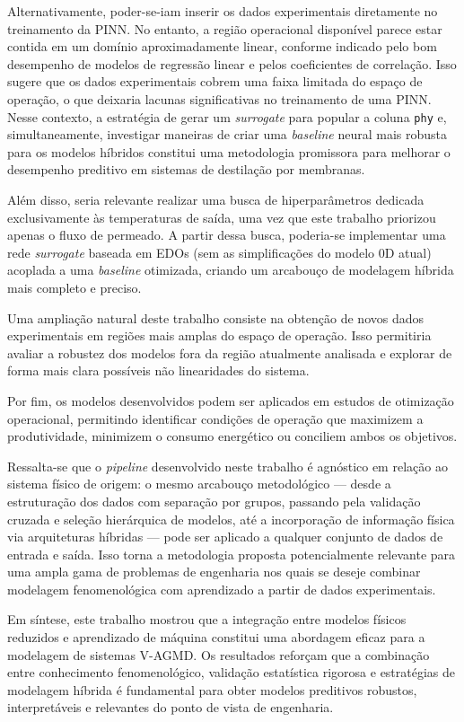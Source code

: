 Alternativamente, poder-se-iam inserir os dados experimentais diretamente no treinamento da PINN. No entanto, a região operacional disponível parece estar contida em um domínio aproximadamente linear, conforme indicado pelo bom desempenho de modelos de regressão linear e pelos coeficientes de correlação. Isso sugere que os dados experimentais cobrem uma faixa limitada do espaço de operação, o que deixaria lacunas significativas no treinamento de uma PINN. Nesse contexto, a estratégia de gerar um \textit{surrogate} para popular a coluna \texttt{phy} e, simultaneamente, investigar maneiras de criar uma \textit{baseline} neural mais robusta para os modelos híbridos constitui uma metodologia promissora para melhorar o desempenho preditivo em sistemas de destilação por membranas.

Além disso, seria relevante realizar uma busca de hiperparâmetros dedicada exclusivamente às temperaturas de saída, uma vez que este trabalho priorizou apenas o fluxo de permeado. A partir dessa busca, poderia-se implementar uma rede \textit{surrogate} baseada em EDOs (sem as simplificações do modelo 0D atual) acoplada a uma \textit{baseline} otimizada, criando um arcabouço de modelagem híbrida mais completo e preciso.

Uma ampliação natural deste trabalho consiste na obtenção de novos dados experimentais em regiões mais amplas do espaço de operação. Isso permitiria avaliar a robustez dos modelos fora da região atualmente analisada e explorar de forma mais clara possíveis não linearidades do sistema.

Por fim, os modelos desenvolvidos podem ser aplicados em estudos de otimização operacional, permitindo identificar condições de operação que maximizem a produtividade, minimizem o consumo energético ou conciliem ambos os objetivos.

Ressalta-se que o \textit{pipeline} desenvolvido neste trabalho é agnóstico em relação ao sistema físico de origem: o mesmo arcabouço metodológico — desde a estruturação dos dados com separação por grupos, passando pela validação cruzada e seleção hierárquica de modelos, até a incorporação de informação física via arquiteturas híbridas — pode ser aplicado a qualquer conjunto de dados de entrada e saída. Isso torna a metodologia proposta potencialmente relevante para uma ampla gama de problemas de engenharia nos quais se deseje combinar modelagem fenomenológica com aprendizado a partir de dados experimentais.

Em síntese, este trabalho mostrou que a integração entre modelos físicos reduzidos e aprendizado de máquina constitui uma abordagem eficaz para a modelagem de sistemas V-AGMD. Os resultados reforçam que a combinação entre conhecimento fenomenológico, validação estatística rigorosa e estratégias de modelagem híbrida é fundamental para obter modelos preditivos robustos, interpretáveis e relevantes do ponto de vista de engenharia.